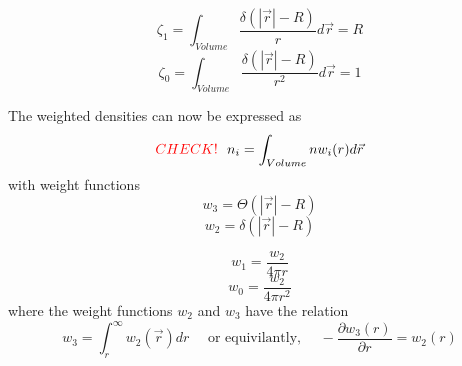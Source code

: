 \documentclass[double,12pt]{beavtex}
\begin{document}
\begin{equation}{\zeta_{1}=\int_{Volume}{\frac{\delta(|\vec{r}|-R)}{r}d{\vec{r}}} = R}\end{equation}
\begin{equation}{\zeta_{0}=\int_{Volume}{\frac{\delta(|\vec{r}|-R)}{r^2}d{\vec{r}}} = 1}\end{equation}

The weighted densities can now be expressed as
\begin{equation}{\color{red} CHECK!~~\color{black}n_{i}=\int_{Volume}{nw_{i}(r)}d{\vec{r}}}\end{equation} 
with weight functions
\begin{equation}\label{eq:w3}{w_{3}=\Theta(|\vec{r}|-R)}\end{equation}
\begin{equation}\label{eq:w2}{w_{2}=\delta(|\vec{r}|-R)}\end{equation}

\begin{equation}\label{eq:w1}{w_{1}=\frac{w_{2}}{4\pi{r}}}\end{equation}
\begin{equation}\label{eq:w0}{w_{0}=\frac{w_{2}}{4\pi{r}^2}}\end{equation}
where the weight functions $w_{2}$ and $w_{3}$ have the relation
\begin{equation}\label{w2_w3_relation}{w_{3}=\int_{r}^{\infty}{w_{2}(\vec{r})dr}\mbox{~~~~or equivilantly,~~~~}-\frac{\partial{w_3(r)}}{\partial{r}}=w_2(r)}\end{equation}
\end{document}
